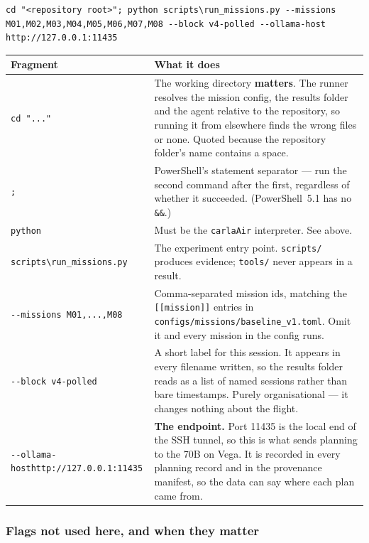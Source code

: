\documentclass[11pt,a4paper]{article}
\begin{document}
\begin{lstlisting}
cd "<repository root>"; python scripts\run_missions.py --missions M01,M02,M03,M04,M05,M06,M07,M08 --block v4-polled --ollama-host http://127.0.0.1:11435
\end{lstlisting}

\begin{center}
\begin{tabularx}{\linewidth}{@{}>{\raggedright\arraybackslash}p{5.2cm} X@{}}
\toprule
\textbf{Fragment} & \textbf{What it does} \\
\midrule
\texttt{cd "..."} & The working directory \textbf{matters}. The runner resolves
the mission config, the results folder and the agent relative to the repository,
so running it from elsewhere finds the wrong files or none. Quoted because the
repository folder's name contains a space. \\
\texttt{;} & PowerShell's statement separator --- run the second command after
the first, regardless of whether it succeeded. (PowerShell~5.1 has no
\texttt{\&\&}.) \\
\texttt{python} & Must be the \texttt{carlaAir} interpreter. See above. \\
\texttt{scripts{\textbackslash}run\_missions.py} & The experiment entry point.
\texttt{scripts/} produces evidence; \texttt{tools/} never appears in a result. \\
\texttt{-{}-missions M01,...,M08} & Comma-separated mission ids, matching the
\texttt{[[mission]]} entries in
\texttt{configs/missions/baseline\_v1.toml}. Omit it and every mission in the
config runs. \\
\texttt{-{}-block v4-polled} & A short label for this session. It appears in
every filename written, so the results folder reads as a list of named sessions
rather than bare timestamps. Purely organisational --- it changes nothing about
the flight. \\
\texttt{-{}-ollama-host}\newline\texttt{http://127.0.0.1:11435} & \textbf{The endpoint.} Port
11435 is the local end of the SSH tunnel, so this is what sends planning to the
70B on Vega. It is recorded in every planning record and in the provenance
manifest, so the data can say where each plan came from. \\
\bottomrule
\end{tabularx}
\end{center}

\subsubsection{Flags not used here, and when they matter}
\end{document}
